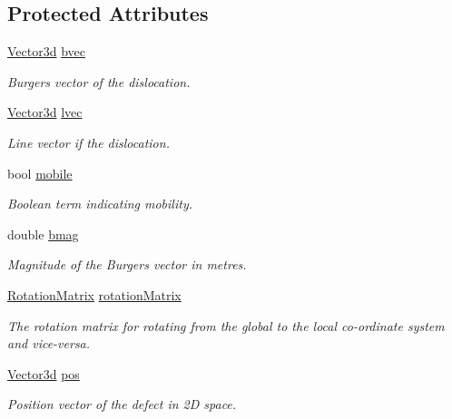 \subsection*{Protected Attributes}
\begin{DoxyCompactItemize}
\item 
\hyperlink{classVector3d}{Vector3d} \hyperlink{classDislocation_aad45c2eaade195f374707afb648ed17e}{bvec}
\begin{DoxyCompactList}\small\item\em Burgers vector of the dislocation. \end{DoxyCompactList}\item 
\hyperlink{classVector3d}{Vector3d} \hyperlink{classDislocation_a69d16092777d9ead2d4eedf7c3d47877}{lvec}
\begin{DoxyCompactList}\small\item\em Line vector if the dislocation. \end{DoxyCompactList}\item 
bool \hyperlink{classDislocation_a62c80daa260a3301baf1dceaab5d23d0}{mobile}
\begin{DoxyCompactList}\small\item\em Boolean term indicating mobility. \end{DoxyCompactList}\item 
double \hyperlink{classDislocation_a2b0284639af7fdfdf44fa0ef7fc1632e}{bmag}
\begin{DoxyCompactList}\small\item\em Magnitude of the Burgers vector in metres. \end{DoxyCompactList}\item 
\hyperlink{classRotationMatrix}{Rotation\-Matrix} \hyperlink{classDislocation_a5699d2984949af836396c8b7e5f21a5e}{rotation\-Matrix}
\begin{DoxyCompactList}\small\item\em The rotation matrix for rotating from the global to the local co-\/ordinate system and vice-\/versa. \end{DoxyCompactList}\item 
\hyperlink{classVector3d}{Vector3d} \hyperlink{classDefect_aed2731c1beefc22e3db6ad5b18194cdd}{pos}
\begin{DoxyCompactList}\small\item\em Position vector of the defect in 2\-D space. \end{DoxyCompactList}\end{DoxyCompactItemize}


